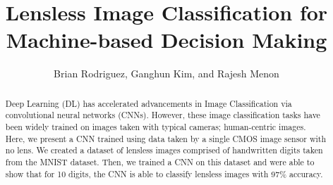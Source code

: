 \documentclass{osa-article}
\begin{document}
\raggedbottom
\title{Lensless Image Classification for Machine-based Decision Making}

\author{Brian Rodriguez, Ganghun Kim, and Rajesh Menon}

\address{Department of Electrical and Computer Engineering, University of Utah, Salt Lake City, UT 84112}


\begin{abstract}
Deep Learning (DL) has accelerated advancements in Image Classification via convolutional neural networks (CNNs). However, these image classification tasks have been widely trained on images taken with typical cameras; human-centric images. Here, we present a CNN trained using data taken by a single CMOS image sensor with no lens. We created a dataset of lensless images comprised of handwritten digits taken from the MNIST dataset. Then, we trained a CNN on this dataset and were able to show that for 10 digits, the CNN is able to classify lensless images with 97\% accuracy.
\end{abstract}
%
\end{document}
